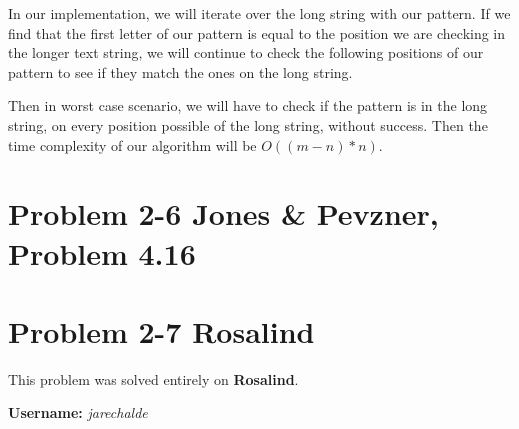 \documentclass{article}
\begin{document}
In our implementation, we will iterate over the long string with our pattern. If we find that the first letter of our pattern is equal to the position we are checking in the longer text string, we will continue to check the following positions of our pattern to see if they match the ones on the long string. 

Then in worst case scenario, we will have to check if the pattern is in the long string, on every position possible of the long string, without success. Then the time complexity of our algorithm will be $O((m-n)*n)$.

\section*{Problem 2-6 Jones \& Pevzner, Problem 4.16}

\section*{Problem 2-7 Rosalind}

This problem was solved entirely on \textbf{Rosalind}.

\textbf{Username:} \textit{jarechalde}
\end{document}
